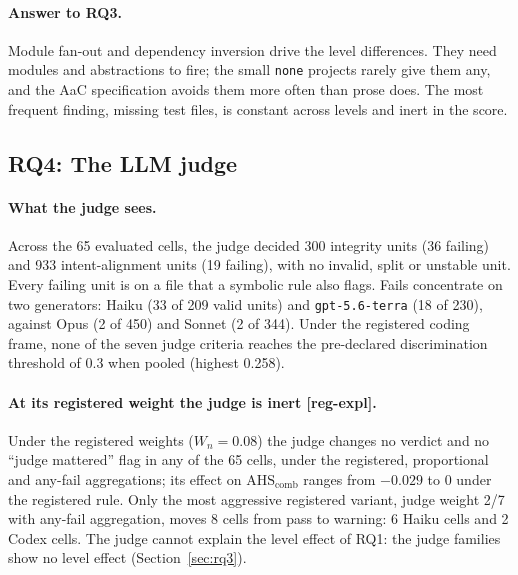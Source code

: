 \documentclass[10pt,a4paper]{article}
\newcommand{\regX}{\textsf{\scriptsize[reg-expl]}}  %
\newcommand{\lev}[1]{\texttt{\small #1}}
\newcommand{\AHSc}{\mathrm{AHS}_{\mathrm{comb}}}
\begin{document}
\paragraph{Answer to RQ3.} Module fan-out and dependency inversion drive the level differences. They need modules
and abstractions to fire; the small \lev{none} projects rarely give them any, and the AaC specification avoids them
more often than prose does. The most frequent finding, missing test files, is constant across levels and inert in the
score.

\subsection{RQ4: The LLM judge}\label{sec:rq4}

\paragraph{What the judge sees.} Across the 65 evaluated cells, the judge decided 300 integrity units (36 failing)
and 933 intent-alignment units (19 failing), with no invalid, split or unstable unit.
Every failing unit is on a file that a symbolic rule also flags. %
Fails concentrate on two generators: Haiku (33 of 209 valid units) and \texttt{gpt-5.6-terra} (18 of 230), against
Opus (2 of 450) and Sonnet (2 of 344). %
Under the registered coding frame, none of the seven judge criteria reaches the pre-declared discrimination
threshold of 0.3 when pooled (highest 0.258). %

\paragraph{At its registered weight the judge is inert \regX{}.} Under the registered weights ($W_n = 0.08$) the
judge changes no verdict and no ``judge mattered'' flag in any of the 65 cells, under the registered, proportional and
any-fail aggregations; its effect on $\AHSc$ ranges from $-0.029$ to 0 under the registered rule.
Only the most aggressive registered variant, judge weight 2/7 with any-fail aggregation, moves 8 cells from pass to
warning: 6 Haiku cells and 2 Codex cells. %
The judge cannot explain the level effect of RQ1: the judge families show no level effect (Section~\ref{sec:rq3}).
\end{document}
